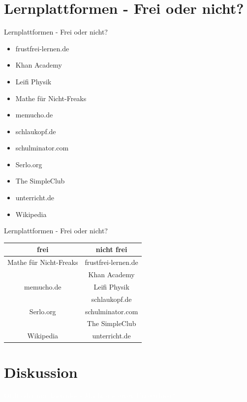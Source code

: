 \documentclass[14pt, usenames, dvipsnames]{beamer}
\begin{document}
\section{Lernplattformen - Frei oder nicht?}

	\begin{frame}{Lernplattformen - Frei oder nicht?}

		\begin{itemize}
			\item frustfrei-lernen.de
			\item Khan Academy
			\item Leifi Physik
			\item Mathe für Nicht-Freaks
			\item memucho.de
			\item schlaukopf.de
			\item schulminator.com
			\item Serlo.org
			\item The SimpleClub
			\item unterricht.de
			\item Wikipedia
		\end{itemize}
	\end{frame}
	\begin{frame}{Lernplattformen - Frei oder nicht?}
        \begin{tabularx}{\textwidth}{c|c}
			\textbf{frei} & \textbf{nicht frei} \\
			\hline
			Mathe für Nicht-Freaks & frustfrei-lernen.de \\
			& Khan Academy \\
			memucho.de & Leifi Physik \\
			& schlaukopf.de \\
			Serlo.org & schulminator.com \\
			& The SimpleClub \\
			Wikipedia & unterricht.de \\
		\end{tabularx}
	\end{frame}

\section{Diskussion}



\begin{frame}{}
    \begin{center}
        \textcolor{white}{\LARGE OER oder \glqq nur\grqq~kostenlos - Macht das einen Unterschied?}
    \end{center}
\end{frame}
\end{document}
